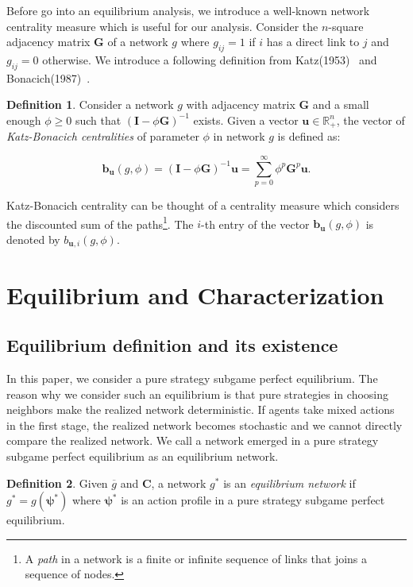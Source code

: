 \documentclass[12pt]{article}
\theoremstyle{definition}
\newtheorem{definition}{Definition}
\newcommand{\bm}[1]{\boldsymbol{#1}}
\begin{document}
Before go into an equilibrium analysis, we introduce a well-known network centrality measure which is useful for our analysis.
Consider the $n$-square adjacency matrix $\bm{G}$ of a network $g$ where $g_{ij} = 1$ if $i$ has a direct link to $j$ and $g_{ij} = 0$ otherwise.
We introduce a following definition from Katz(1953)~\cite{katz} and Bonacich(1987)~\cite{bonacich}.

\begin{definition}
Consider a network $g$ with adjacency matrix $\bm{G}$ and a small enough $\phi \ge 0$ such that ${(\bm{I} - \phi \bm{G})}^{-1}$ exists. Given a vector $\bm{u} \in \mathbb{R}_+^n$, the vector of {\it{Katz-Bonacich centralities}} of parameter $\phi$ in network $g$ is defined as:

\[ \bm{b}_{\bm{u}}(g, \phi) = {(\bm{I} - \phi \bm{G})}^{-1} \bm{u} = \sum_{p=0}^{\infty} \phi^p \bm{G}^p \bm{u}. \]

\end{definition}

Katz-Bonacich centrality can be thought of a centrality measure which considers the discounted sum of the paths\footnote{A {\it{path}} in a network is a finite or infinite sequence of links that joins a sequence of nodes.}.
The $i$-th entry of the vector $\bm{b}_{\bm{u}}(g, \phi)$ is denoted by $b_{\bm{u}, i}(g, \phi)$.


\section{Equilibrium and Characterization}


\subsection{Equilibrium definition and its existence}

In this paper, we consider a pure strategy subgame perfect equilibrium.
The reason why we consider such an equilibrium is that pure strategies in choosing neighbors make the realized network deterministic.
If agents take mixed actions in the first stage, the realized network becomes stochastic and we cannot directly compare the realized network.
We call a network emerged in a pure strategy subgame perfect equilibrium as an equilibrium network.

\begin{definition}
Given $\overline{g}$ and $\bm{C}$, a network $g^*$ is an {\it{equilibrium network}} if $g^* = g(\bm{\psi}^*)$ where $\bm{\psi}^*$ is an action profile in a pure strategy subgame perfect equilibrium.
\end{definition}
\end{document}

